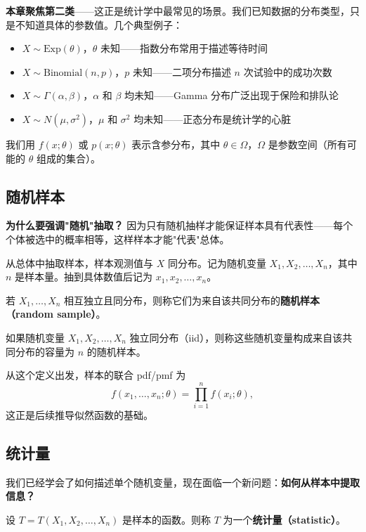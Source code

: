 \textbf{本章聚焦第二类}——这正是统计学中最常见的场景。我们已知数据的分布类型，只是不知道具体的参数值。几个典型例子：

\begin{itemize}
\item[(a)] $X \sim \mathrm{Exp}(\theta)$，$\theta$ 未知——指数分布常用于描述等待时间
\item[(b)] $X \sim \mathrm{Binomial}(n,p)$，$p$ 未知——二项分布描述 $n$ 次试验中的成功次数
\item[(c)] $X \sim \Gamma(\alpha,\beta)$，$\alpha$ 和 $\beta$ 均未知——Gamma 分布广泛出现于保险和排队论
\item[(d)] $X \sim N(\mu,\sigma^2)$，$\mu$ 和 $\sigma^2$ 均未知——正态分布是统计学的心脏
\end{itemize}

我们用 $f(x;\theta)$ 或 $p(x;\theta)$ 表示含参分布，其中 $\theta \in \Omega$，$\Omega$ 是参数空间（所有可能的 $\theta$ 组成的集合）。

\subsection{随机样本}

\textbf{为什么要强调"随机"抽取？} 因为只有随机抽样才能保证样本具有代表性——每个个体被选中的概率相等，这样样本才能"代表"总体。

从总体中抽取样本，样本观测值与 $X$ 同分布。记为随机变量 $X_1, X_2, \ldots, X_n$，其中 $n$ 是样本量。抽到具体数值后记为 $x_1, x_2, \ldots, x_n$。

若 $X_1, \ldots, X_n$ 相互独立且同分布，则称它们为来自该共同分布的\textbf{随机样本（random sample）}。

\begin{definition}[随机样本]\label{def:random-sample-ch4}
如果随机变量 $X_1, X_2, \ldots, X_n$ 独立同分布（iid），则称这些随机变量构成来自该共同分布的容量为 $n$ 的随机样本。
\end{definition}

从这个定义出发，样本的联合 pdf/pmf 为
\[
f(x_1, \ldots, x_n; \theta) = \prod_{i=1}^n f(x_i; \theta),
\]
这正是后续推导似然函数的基础。

\subsection{统计量}

我们已经学会了如何描述单个随机变量，现在面临一个新问题：\textbf{如何从样本中提取信息？}

设 $T = T(X_1, X_2, \ldots, X_n)$ 是样本的函数。则称 $T$ 为一个\textbf{统计量（statistic）}。


